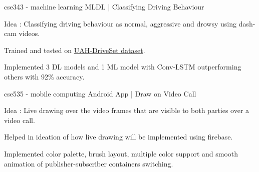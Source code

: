 
\begin{cventries}
  \cventry
    {cse343 - machine learning} %
    {ML{\hspace{0.2em}\cdotp\hspace{0.2em}}DL | Classifying Driving Behaviour} %
    {} %
    {} %
    {
      \begin{cvitems}
        \item {Idea : Classifying driving behaviour as normal, aggressive and drowsy using dash-cam videos.}
        \item {Trained and tested on \href{http://www.robesafe.uah.es/personal/eduardo.romera/uah-driveset/}{UAH-DriveSet dataset}.}
        \item {Implemented 3 DL models and 1 ML model with Conv-LSTM outperforming others with 92\% accuracy.}
      \end{cvitems}
    }
    {}

  \cventry
    {cse535 - mobile computing} %
    {Android App | Draw on Video Call} %
    {} %
    {} %
    {
      \begin{cvitems}
        \item {Idea : Live drawing over the video frames that are visible to both parties over a video call.}
        \item {Helped in ideation of how live drawing will be implemented using firebase.}
        \item {Implemented color palette, brush layout, multiple color support and smooth animation of publisher-subscriber containers switching.}
      \end{cvitems}
    }
    {}


\end{cventries}

